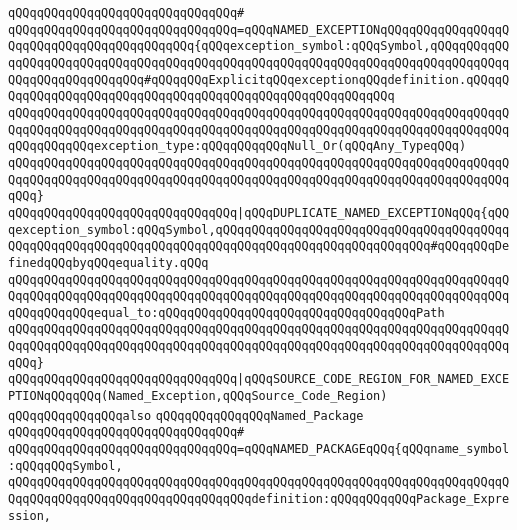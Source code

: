 \verb|qQQqqQQqqQQqqQQqqQQqqQQqqQQqqQQq#|\newline
\verb|qQQqqQQqqQQqqQQqqQQqqQQqqQQqqQQq=qQQqNAMED_EXCEPTIONqQQqqQQqqQQqqQQqqQQqqQQqqQQqqQQqqQQqqQQqqQQq{qQQqexception_symbol:qQQqSymbol,qQQqqQQqqQQqqQQqqQQqqQQqqQQqqQQqqQQqqQQqqQQqqQQqqQQqqQQqqQQqqQQqqQQqqQQqqQQqqQQqqQQqqQQqqQQqqQQqqQQq#qQQqqQQqExplicitqQQqexceptionqQQqdefinition.qQQqqQQqqQQqqQQqqQQqqQQqqQQqqQQqqQQqqQQqqQQqqQQqqQQqqQQqqQQq|\newline
\verb|qQQqqQQqqQQqqQQqqQQqqQQqqQQqqQQqqQQqqQQqqQQqqQQqqQQqqQQqqQQqqQQqqQQqqQQqqQQqqQQqqQQqqQQqqQQqqQQqqQQqqQQqqQQqqQQqqQQqqQQqqQQqqQQqqQQqqQQqqQQqqQQqqQQqqQQqexception_type:qQQqqQQqqQQqNull_Or(qQQqAny_TypeqQQq)|\newline
\verb|qQQqqQQqqQQqqQQqqQQqqQQqqQQqqQQqqQQqqQQqqQQqqQQqqQQqqQQqqQQqqQQqqQQqqQQqqQQqqQQqqQQqqQQqqQQqqQQqqQQqqQQqqQQqqQQqqQQqqQQqqQQqqQQqqQQqqQQqqQQqqQQq}|\newline
\newline
\verb|qQQqqQQqqQQqqQQqqQQqqQQqqQQqqQQq|\verb#|qQQqDUPLICATE_NAMED_EXCEPTIONqQQq{qQQqexception_symbol:qQQqSymbol,qQQqqQQqqQQqqQQqqQQqqQQqqQQqqQQqqQQqqQQqqQQqqQQqqQQqqQQqqQQqqQQqqQQqqQQqqQQqqQQqqQQqqQQqqQQqqQQqqQQq#\verb|#qQQqqQQqDefinedqQQqbyqQQqequality.qQQq|\newline
\verb|qQQqqQQqqQQqqQQqqQQqqQQqqQQqqQQqqQQqqQQqqQQqqQQqqQQqqQQqqQQqqQQqqQQqqQQqqQQqqQQqqQQqqQQqqQQqqQQqqQQqqQQqqQQqqQQqqQQqqQQqqQQqqQQqqQQqqQQqqQQqqQQqqQQqqQQqequal_to:qQQqqQQqqQQqqQQqqQQqqQQqqQQqqQQqqQQqPath|\newline
\verb|qQQqqQQqqQQqqQQqqQQqqQQqqQQqqQQqqQQqqQQqqQQqqQQqqQQqqQQqqQQqqQQqqQQqqQQqqQQqqQQqqQQqqQQqqQQqqQQqqQQqqQQqqQQqqQQqqQQqqQQqqQQqqQQqqQQqqQQqqQQqqQQq}|\newline
\newline
\verb|qQQqqQQqqQQqqQQqqQQqqQQqqQQqqQQq|\verb#|qQQqSOURCE_CODE_REGION_FOR_NAMED_EXCEPTIONqQQqqQQq(Named_Exception,qQQqSource_Code_Region)#\newline
\newline
\newline
\newline
\verb|qQQqqQQqqQQqqQQqalso|\newline
\verb|qQQqqQQqqQQqqQQqNamed_Package|\newline
\verb|qQQqqQQqqQQqqQQqqQQqqQQqqQQqqQQq#|\newline
\verb|qQQqqQQqqQQqqQQqqQQqqQQqqQQqqQQq=qQQqNAMED_PACKAGEqQQq{qQQqname_symbol:qQQqqQQqSymbol,|\newline
\verb|qQQqqQQqqQQqqQQqqQQqqQQqqQQqqQQqqQQqqQQqqQQqqQQqqQQqqQQqqQQqqQQqqQQqqQQqqQQqqQQqqQQqqQQqqQQqqQQqqQQqqQQqdefinition:qQQqqQQqqQQqPackage_Expression,|\newline
